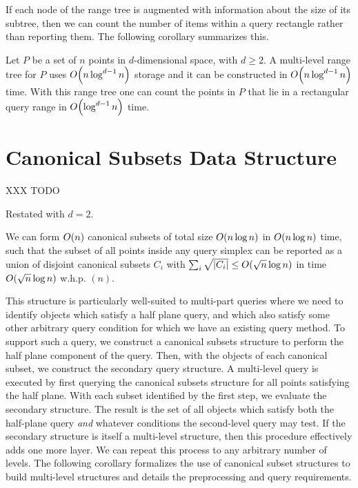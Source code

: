 If each node of the range tree is augmented with information about the size of its subtree, then we can count the number of items within a query rectangle rather than reporting them. The following corollary summarizes this.

\begin{corollary}
\label{cor:rangetree}
Let $P$ be a set of $n$ points in $d$-dimensional space, with $d \geq 2$. A multi-level range tree for $P$ uses $O\!\left(n \log^{d-1}{n}\right)$ storage and it can be constructed in $O\!\left(n \log^{d-1}{n}\right)$ time. With this range tree one can count the points in $P$ that lie in a rectangular query range in $O\!\left(\log^{d-1}{n}\right)$ time.
\end{corollary}


\section{Canonical Subsets Data Structure}
\label{:prelim:chan}

XXX TODO

Restated with $d=2$.

\begin{theorem}
\label{th:chan}
We can form $O\!\left(n\right)$ canonical subsets of total size $O\!\left(n \log{n}\right)$ in $O\!\left(n \log{n}\right)$ time, such that the subset of all points inside any query simplex can be reported as a union of disjoint canonical subsets $C_i$ with $\sum_i{\sqrt{|C_i|}} \leq O\!\left(\sqrt{n}\log{n}\right)$ in time $O\!\left(\sqrt{n}\log{n}\right)$ w.h.p. $(n)$.
\end{theorem}

This structure is particularly well-suited to multi-part queries where we need to identify objects which satisfy a half plane query, and which also satisfy some other arbitrary query condition for which we have an existing query method.
To support such a query, we construct a canonical subsets structure to perform the half plane component of the query. 
Then, with the objects of each canonical subset, we construct the secondary query structure.
A multi-level query is executed by first querying the canonical subsets structure for all points satisfying the half plane.
With each subset identified by the first step, we evaluate the secondary structure.
The result is the set of all objects which satisfy both the half-plane query \emph{and} whatever conditions the second-level query may test.
If the secondary structure is itself a multi-level structure, then this procedure effectively adds one more layer.
We can repeat this process to any arbitrary number of levels.
The following corollary formalizes the use of canonical subset structures to build multi-level structures and details the preprocessing and query requirements.



